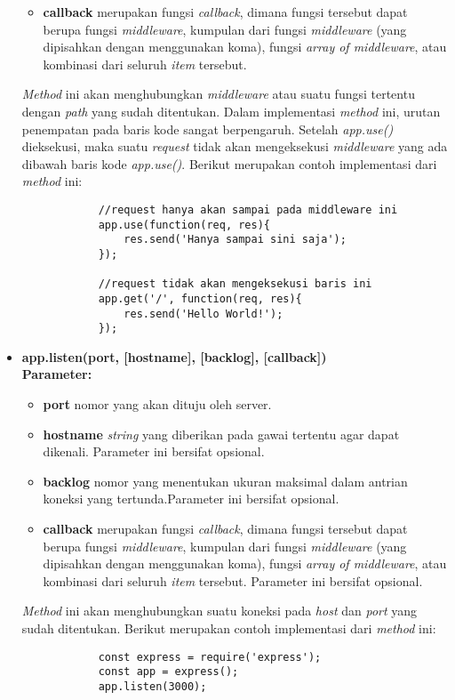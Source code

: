 \begin{itemize}
\begin{itemize}
			\item \textbf{callback} merupakan fungsi \textit{callback}, dimana fungsi tersebut dapat berupa fungsi \textit{middleware}, kumpulan dari fungsi \textit{middleware} (yang dipisahkan dengan menggunakan koma), fungsi \textit{array of middleware}, atau kombinasi dari seluruh \textit{item} tersebut.
		\end{itemize}
	
		\textit{Method} ini akan menghubungkan \textit{middleware} atau suatu fungsi tertentu dengan \textit{path} yang sudah ditentukan. Dalam implementasi \textit{method} ini, urutan penempatan pada baris kode sangat berpengaruh. Setelah \textit{app.use()} dieksekusi, maka suatu \textit{request} tidak akan mengeksekusi \textit{middleware} yang ada dibawah baris kode \textit{app.use()}.  Berikut merupakan contoh implementasi dari \textit{method} ini:
		\begin{lstlisting}
			//request hanya akan sampai pada middleware ini
			app.use(function(req, res){
				res.send('Hanya sampai sini saja');
			});
			
			//request tidak akan mengeksekusi baris ini
			app.get('/', function(req, res){
				res.send('Hello World!');
			});
		\end{lstlisting}
		
	\item \textbf{app.listen(port, [hostname], [backlog], [callback])} \\ \textbf{Parameter:}
		\begin{itemize}
			\item \textbf{port} nomor yang akan dituju oleh server.
			\item \textbf{hostname} \textit{string} yang diberikan pada gawai tertentu agar dapat dikenali. Parameter ini bersifat opsional.
			\item \textbf{backlog} nomor yang menentukan ukuran maksimal dalam antrian koneksi yang tertunda.Parameter ini bersifat opsional.
			\item \textbf{callback} merupakan fungsi \textit{callback}, dimana fungsi tersebut dapat berupa fungsi \textit{middleware}, kumpulan dari fungsi \textit{middleware} (yang dipisahkan dengan menggunakan koma), fungsi \textit{array of middleware}, atau kombinasi dari seluruh \textit{item} tersebut. Parameter ini bersifat opsional.
		\end{itemize}
	
		\textit{Method} ini akan menghubungkan suatu koneksi pada \textit{host} dan \textit{port} yang sudah ditentukan. Berikut merupakan contoh implementasi dari \textit{method} ini:
		\begin{lstlisting}
			const express = require('express');
			const app = express();
			app.listen(3000);
		\end{lstlisting}
		
\end{itemize}

